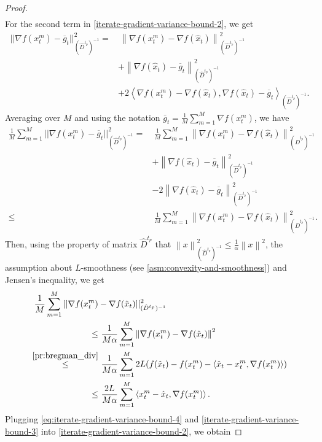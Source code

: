 \documentclass[sn-mathphys,Numbered]{sn-jnl}%
\renewcommand{\|}{\parallel}
\newcommand\ev[1]{\left \langle #1 \right \rangle}
\newcommand{\sqn}[1]{{\left\lVert#1\right\rVert}^2}
\renewcommand {\*} {\ast}
\begin{document}
\begin{proof}
\begin{align}
     \end{align}
     For the second term in \eqref{iterate-gradient-variance-bound-2}, we get
     \begin{align*}
         ||\nabla f(x_t^m) - \overline{g}_t||^2_{(\hat{D}^{t_p})^{-1}} =&\ \sqn{\nabla f(x_t^m) - \nabla f(\hat{x}_t)}_{(\hat{D}^{t_p})^{-1}} \\ &+ \sqn{\nabla f(\hat{x}_t) - \overline{g}_t }_{(\hat{D}^{t_p})^{-1}} \\
          &+ 2 \ev{\nabla f(x_t^m) - \nabla f(\hat{x}_t), \nabla f(\hat{x}_t) - \overline{g}_t  }_{(\hat{D}^{t_p})^{-1}}.
     \end{align*}
     Averaging over $M$ and using the notation $\bar{g}_t = \frac{1}{M} \sum\limits_{m=1}^M \nabla f(x_t^m)$, we have
     \begin{align*}
         \frac{1}{M} \sum_{m=1}^{M} ||\nabla f(x_t^m) - \overline{g}_t||^2_{(\hat{D}^{t_p})^{-1}} =&\ \frac{1}{M} \sum\limits_{m=1}^M \sqn{\nabla f(x_t^m) - \nabla f(\hat{x}_t)}_{(\hat{D}^{t_p})^{-1} } \\ &+ \sqn{ \nabla f(\hat{x}_t) - \overline{g}_t}_{(\hat{D}^{t_p})^{-1}} \\
         &- 2 \sqn{\nabla f(\hat{x}_t) - \overline{g}_t}_{(\hat{D}^{t_p})^{-1}} \\
         \leq&\ \frac{1}{M} \sum\limits_{m=1}^M \sqn{\nabla f(x_t^m) -  \nabla f(\hat{x}_t)}_{(\hat{D}^{t_p})^{-1}}.
     \end{align*}
     Then, using the property of matrix $\hat{D}^{t_p}$ that $\sqn{x}_{(\hat{D}^{t_p})^{-1}} \leq \frac{1}{\alpha}\sqn{x}$, the assumption about $L$-smoothness (see \cref{asm:convexity-and-smoothness}) and Jensen's inequality, we get
     \begin{align}
         \frac{1}{M} \sum\limits_{m=1}^M ||\nabla f(x_t^m) &- \nabla f(\hat{x}_t)||^2_{(\hat{D}^{t_p})^{-1}} \nonumber \\ \leq&\ \frac{1}{M\alpha} \sum\limits_{m=1}^M \sqn{\nabla f(x_{t}^m) - \nabla f(\hat{x}_t) } \nonumber \\
         \overset{\eqref{pr:bregman_div}}{\le}&\ \frac{1}{M\alpha} \sum\limits_{m=1}^M 2L (f(\hat x_t) - f(x_t^m) - \ev{\hat x_t - x_t^m, \nabla f(x_t^m)}) \nonumber \\
         \label{eq:iterate-gradient-variance-bound-4}
         \le&\ \frac{2L}{M\alpha} \sum\limits_{m=1}^M \ev{x_t^m - \hat x_t, \nabla f(x_t^m)}.
     \end{align}
     Plugging \eqref{eq:iterate-gradient-variance-bound-4} and \eqref{iterate-gradient-variance-bound-3} into \eqref{iterate-gradient-variance-bound-2}, we obtain

\end{proof}
\end{document}
